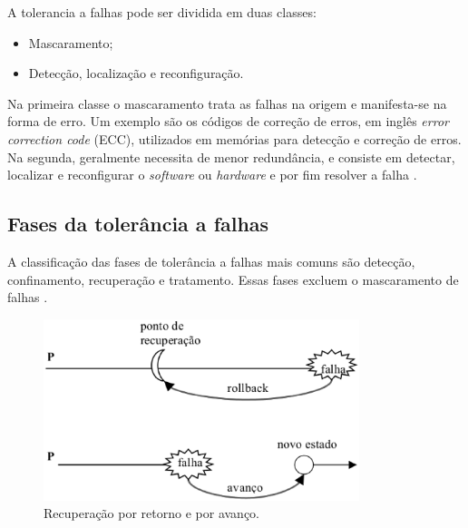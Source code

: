 A tolerancia a falhas pode ser dividida em duas classes:
\begin{itemize}
 \item Mascaramento;
 \item Detecção, localização e reconfiguração.
\end{itemize}

Na primeira classe o mascaramento trata as falhas na origem e manifesta-se na forma de erro. Um exemplo são os 
códigos de correção de erros, em inglês \textit{error correction code} (ECC), utilizados em memórias para detecção e correção de erros.
Na segunda, geralmente necessita de menor redundância, e consiste em detectar, localizar e reconfigurar o \textit{software} ou
\textit{hardware} e por fim resolver a falha \cite{weber2002}.

\subsection{Fases da tolerância a falhas}

A classificação das fases de tolerância a falhas mais comuns são detecção, confinamento, recuperação e tratamento. Essas fases excluem
o mascaramento de falhas \cite{weber2002}.

\begin{figure}[falhasrecup]
 \centering
 \includegraphics[height=200px]{img/recuperacao_ret_ava.eps}
 \caption{Recuperação por retorno e por avanço.}
 \label{fig:recuperacao_ret_ava}
\end{figure}


